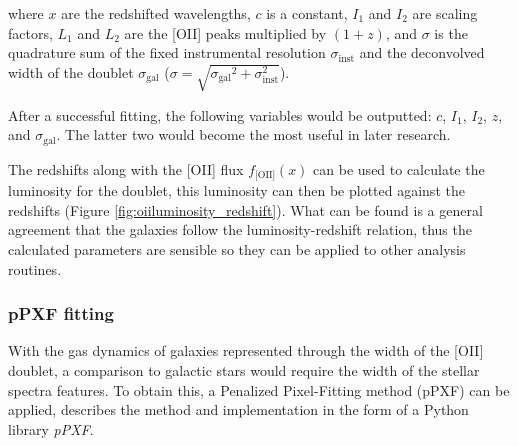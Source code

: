 \documentclass[12pt, twocolumn]{revtex4}    %
\begin{document}
where $x$ are the redshifted wavelengths, ${c}$ is a constant, ${I_1}$ and ${I_2}$ are scaling factors, $L_1$ and $L_2$ are the [OII] peaks multiplied by $(1+{z})$, and $\sigma$ is the quadrature sum of the fixed instrumental resolution $\sigma_{\text{inst}}$ and the deconvolved width of the doublet $\sigma_{\text{gal}}$ ($\sigma=\sqrt{{\sigma_{\text{gal}}}^2 + \sigma_{\text{inst}}^2}$).



After a successful fitting, the following variables would be outputted: $c$, $I_1$, $I_2$, $z$, and $\sigma_{\text{gal}}$. The latter two would become the most useful in later research. 

The redshifts along with the [OII] flux $f_{\text{[OII]}}(x)$ can be used to calculate the luminosity for the doublet, this luminosity can then be plotted against the redshifts (Figure \ref{fig:oiiluminosity_redshift}). What can be found is a general agreement that the galaxies follow the luminosity-redshift relation, thus the calculated parameters are sensible so they can be applied to other analysis routines.

\subsubsection{pPXF fitting}

With the gas dynamics of galaxies represented through the width of the [OII] doublet, a comparison to galactic stars would require the width of the stellar spectra features. To obtain this, a Penalized Pixel-Fitting method (pPXF) can be applied, \cite{cappaellari_ppxf} describes the method and implementation in the form of a Python library \textit{pPXF}.
\end{document}
